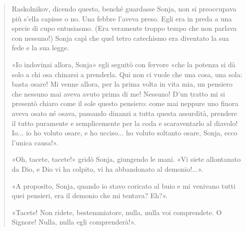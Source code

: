 \documentclass{book}
\begin{document}
\begin{quote}
Raskolnikov, dicendo questo, benché guardasse Sonja, non si preoccupava più s'ella capisse o
no. Una febbre l'aveva preso. Egli era in preda a una specie di cupo entusiasmo. (Era
veramente troppo tempo che non parlava con nessuno!) Sonja capì che quel tetro catechismo
era diventato la sua fede e la sua legge.

«Io indovinai allora, Sonja» egli seguitò con fervore «che la potenza si dà solo a chi osa chinarsi
a prenderla. Qui non ci vuole che una cosa, una sola: basta osare! Mi venne allora, per la prima
volta in vita mia, un pensiero che nessuno mai aveva avuto prima di me! Nessuno! D'un tratto
mi si presentò chiaro come il sole questo pensiero: come mai neppure uno finora aveva osato
né osava, passando dinanzi a tutta questa assurdità, prendere il tutto puramente e
semplicemente per la coda e scaraventarlo al diavolo! Io... io ho voluto osare, e ho ucciso... ho
voluto soltanto osare, Sonja, ecco l'unica causa!».

«Oh, tacete, tacete!» gridò Sonja, giungendo le mani. «Vi siete allontanato da Dio, e Dio vi ha
colpito, vi ha abbandonato al demonio!...».

«A proposito, Sonja, quando io stavo coricato al buio e mi venivano tutti quei pensieri, era il
demonio che mi tentava? Eh?».

«Tacete! Non ridete, bestemmiatore, nulla, nulla voi comprendete. O Signore! Nulla, nulla egli
comprenderà!».


\end{quote}
\end{document}
